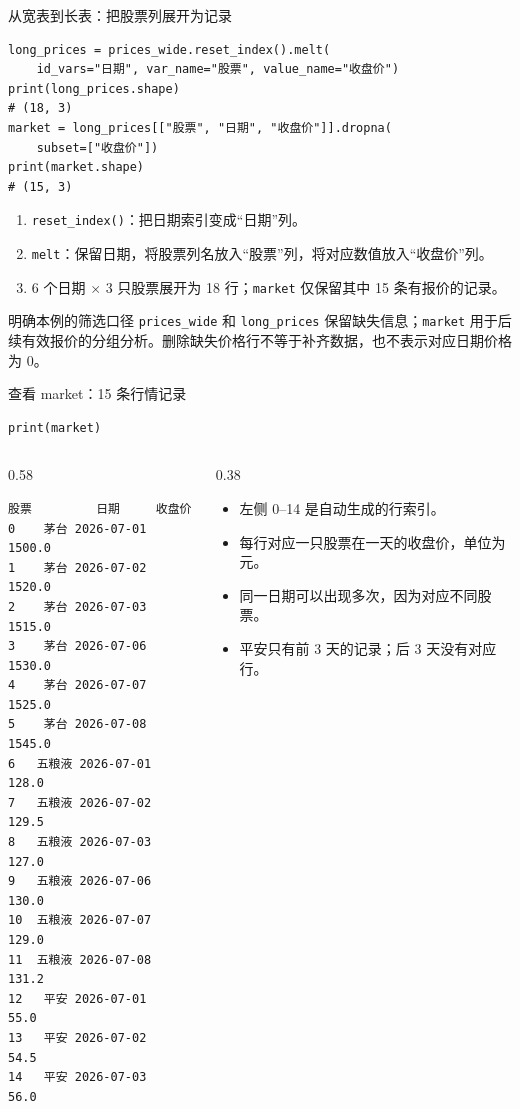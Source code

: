 \documentclass[9pt]{ctexbeamer}
\begin{document}
\begin{frame}[fragile]{从宽表到长表：把股票列展开为记录}
\begin{lstlisting}
long_prices = prices_wide.reset_index().melt(
    id_vars="日期", var_name="股票", value_name="收盘价")
print(long_prices.shape)
# (18, 3)
market = long_prices[["股票", "日期", "收盘价"]].dropna(
    subset=["收盘价"])
print(market.shape)
# (15, 3)
\end{lstlisting}
\begin{enumerate}
\item \texttt{reset\_index()}：把日期索引变成“日期”列。
\item \texttt{melt}：保留日期，将股票列名放入“股票”列，将对应数值放入“收盘价”列。
\item 6 个日期 $\times$ 3 只股票展开为 18 行；\texttt{market} 仅保留其中 15 条有报价的记录。
\end{enumerate}
\begin{block}{明确本例的筛选口径}
\texttt{prices\_wide} 和 \texttt{long\_prices} 保留缺失信息；\texttt{market} 用于后续有效报价的分组分析。删除缺失价格行不等于补齐数据，也不表示对应日期价格为 0。
\end{block}
\end{frame}

\begin{frame}[fragile]{查看 market：15 条行情记录}
\begin{lstlisting}
print(market)
\end{lstlisting}
\begin{columns}[T]
\begin{column}{0.58\textwidth}
\begin{lstlisting}[language={},basicstyle=\ttfamily\scriptsize]
     股票         日期     收盘价
0    茅台 2026-07-01  1500.0
1    茅台 2026-07-02  1520.0
2    茅台 2026-07-03  1515.0
3    茅台 2026-07-06  1530.0
4    茅台 2026-07-07  1525.0
5    茅台 2026-07-08  1545.0
6   五粮液 2026-07-01   128.0
7   五粮液 2026-07-02   129.5
8   五粮液 2026-07-03   127.0
9   五粮液 2026-07-06   130.0
10  五粮液 2026-07-07   129.0
11  五粮液 2026-07-08   131.2
12   平安 2026-07-01    55.0
13   平安 2026-07-02    54.5
14   平安 2026-07-03    56.0
\end{lstlisting}
\end{column}
\begin{column}{0.38\textwidth}
\small
\begin{itemize}
\item 左侧 0--14 是自动生成的行索引。
\item 每行对应一只股票在一天的收盘价，单位为元。
\item 同一日期可以出现多次，因为对应不同股票。
\item 平安只有前 3 天的记录；后 3 天没有对应行。
\end{itemize}
\end{column}
\end{columns}
\end{frame}
\end{document}
